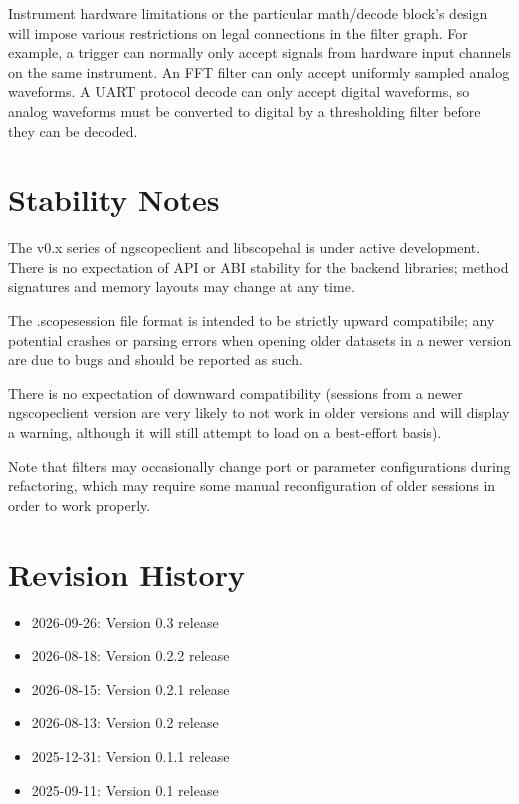 Instrument hardware limitations or the particular math/decode block's design will impose various restrictions on legal
connections in the filter graph. For example, a trigger can normally only accept signals from hardware input channels
on the same instrument. An FFT filter can only accept uniformly sampled analog waveforms. A UART protocol decode can
only accept digital waveforms, so analog waveforms must be converted to digital by a thresholding filter before they
can be decoded.

\section{Stability Notes}

The v0.x series of ngscopeclient and libscopehal is under active development. There is no expectation of API or ABI
stability for the backend libraries; method signatures and memory layouts may change at any time.

The .scopesession file format is intended to be strictly upward compatibile; any potential crashes or parsing errors
when opening older datasets in a newer version are due to bugs and should be reported as such.

There is no expectation of downward compatibility (sessions from a newer ngscopeclient version are very likely to not
work in older versions and will display a warning, although it will still attempt to load on a best-effort basis).

Note that filters may occasionally change port or parameter configurations during refactoring, which may require some
manual reconfiguration of older sessions in order to work properly.

\section{Revision History}
\begin{itemize}
\item 2026-09-26: Version 0.3 release
\item 2026-08-18: Version 0.2.2 release
\item 2026-08-15: Version 0.2.1 release
\item 2026-08-13: Version 0.2 release
\item 2025-12-31: Version 0.1.1 release
\item 2025-09-11: Version 0.1 release
\end{itemize}
